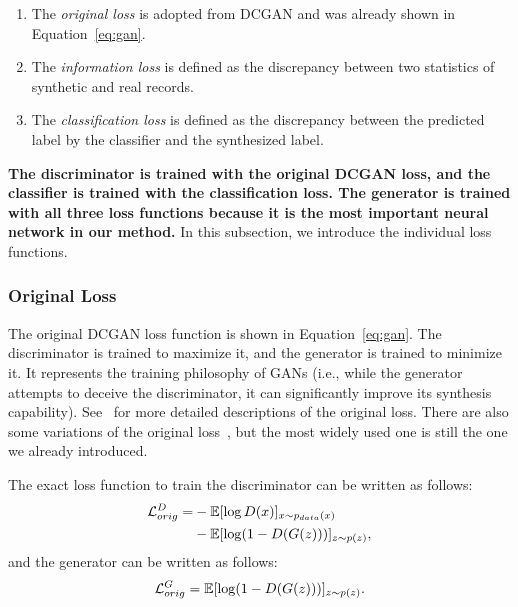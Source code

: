 \begin{enumerate}
\item The \textit{original loss} is adopted from DCGAN and was already shown in Equation~\ref{eq:gan}.
\item The \textit{information loss} is defined as the discrepancy between two statistics of synthetic and real records.
\item The \textit{classification loss} is defined as the discrepancy between the predicted label by the classifier and the synthesized label.
\end{enumerate}



\textbf{The discriminator is trained with the original DCGAN loss, and the classifier is trained with the classification loss. The generator is trained with all three loss functions because it is the most important neural network in our method.} In this subsection, we introduce the individual loss functions.

\subsubsection{Original Loss}
The original DCGAN loss function is shown in Equation~\ref{eq:gan}. The discriminator is trained to maximize it, and the generator is trained to minimize it. It represents the training philosophy of GANs (i.e., while the generator attempts to deceive the discriminator, it can significantly improve its synthesis capability). See~\cite{goodfellow2014generative,radford_dcgan_2015} for more detailed descriptions of the original loss. There are also some variations of the original loss~\cite{2017arXiv170104862A}, but the most widely used one is still the one we already introduced.

The exact loss function to train the discriminator can be written as follows:
\begin{equation}\label{eq:origD}\begin{aligned}
\mathcal{L}_{orig}^{D} = & -\mathbb{E}[\log D(x)]_{x \sim p_{data}(x)} \\
  & - \mathbb{E}[\log (1-D(G(z)))]_{z \sim p(z)},
\end{aligned}\end{equation}
and the generator can be written as follows:
\begin{equation}\label{eq:origG}\begin{aligned}
\mathcal{L}_{orig}^{G} = \mathbb{E}[\log (1-D(G(z)))]_{z \sim p(z)}.
\end{aligned}\end{equation}

